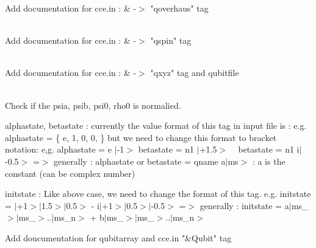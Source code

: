 \begin{DoxyRefList}
\label{todo__todo000022}%
%
Add documentation for cce.\+in \+: \& -\/\texorpdfstring{$>$}{>} "{}qoverhaus"{} tag  
\item[Member \doxylink{structQubit_a858930b7d9d9cafc70f26ab7993dadad}{Qubit\+::spin} ]\hfill \\
\label{todo__todo000018}%
%
Add documentation for cce.\+in \+: \& -\/\texorpdfstring{$>$}{>} "{}qspin"{} tag  
\item[Member \doxylink{structQubit_a799cb32b473160eb8e9e4aa6c9c39b18}{Qubit\+::xyz} \mbox{[}3\mbox{]}]\hfill \\
\label{todo__todo000020}%
%
Add documentation for cce.\+in \+: \& -\/\texorpdfstring{$>$}{>} "{}qxyz"{} tag and qubitfile  
\item[Struct \doxylink{structQubitArray}{Qubit\+Array} ]\hfill \\
\label{todo__todo000015}%
%
Check if the psia, psib, psi0, rho0 is normalied. 

\label{todo__todo000016}%
%
alphastate, betastate \+: currently the value format of this tag in input file is \+: e.\+g. alphastate = \{ e, 1, 0, 0, \} but we need to change this format to bracket notation\+: e,g. alphastate = e \texorpdfstring{$\vert$}{|}-\/1\texorpdfstring{$>$}{>} betastate = n1 \texorpdfstring{$\vert$}{|}+1.5\texorpdfstring{$>$}{>} ~\newline
 betastate = n1 i\texorpdfstring{$\vert$}{|}-\/0.5\texorpdfstring{$>$}{>} =\texorpdfstring{$>$}{>} generally \+: alphastate or betastate = qname a\texorpdfstring{$\vert$}{|}ms\texorpdfstring{$>$}{>} \+: a is the constant (can be complex number) 



initstate \+: Like above case, we need to change the format of this tag. e.\+g. initstate = \texorpdfstring{$\vert$}{|}+1\texorpdfstring{$>$}{>}\texorpdfstring{$\vert$}{|}1.5\texorpdfstring{$>$}{>}\texorpdfstring{$\vert$}{|}0.5\texorpdfstring{$>$}{>} -\/ i\texorpdfstring{$\vert$}{|}+1\texorpdfstring{$>$}{>}\texorpdfstring{$\vert$}{|}0.5\texorpdfstring{$>$}{>}\texorpdfstring{$\vert$}{|}-\/0.5\texorpdfstring{$>$}{>} =\texorpdfstring{$>$}{>} generally \+: initstate = a\texorpdfstring{$\vert$}{|}ms\+\_\texorpdfstring{$>$}{>}\texorpdfstring{$\vert$}{|}ms\+\_\texorpdfstring{$>$}{>}..\texorpdfstring{$\vert$}{|}ms\+\_\+n\texorpdfstring{$>$}{>} + b\texorpdfstring{$\vert$}{|}ms\textquotesingle{}\+\_\texorpdfstring{$>$}{>}\texorpdfstring{$\vert$}{|}ms\textquotesingle{}\+\_\texorpdfstring{$>$}{>}..\texorpdfstring{$\vert$}{|}ms\textquotesingle{}\+\_\+n\texorpdfstring{$>$}{>} 



Add doucumentation for qubitarray and cce.\+in "{}\&\+Qubit"{} tag 
\end{DoxyRefList}